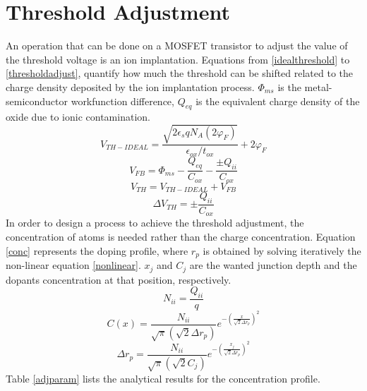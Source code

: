 \documentclass[11pt,a4paper]{article}
\begin{document}
	\section{Threshold Adjustment}
	An operation that can be done on a MOSFET transistor to adjust the value of the threshold voltage is an ion implantation. Equations from \ref*{idealthreshold} to \ref*{thresholdadjust}, quantify how much the threshold can be shifted related to the charge density deposited by the ion implantation process. $\Phi_{ms}$ is the metal-semiconductor workfunction difference, $Q_{eq}$ is the equivalent charge density of the oxide due to ionic contamination.
	\begin{equation}\label{idealthreshold}
		V_{TH-IDEAL} = \frac{\sqrt{2\epsilon_s q N_A\left(2\varphi_F\right)}}{\epsilon_{ox}/t_{ox}} + 2\varphi_F
	\end{equation}
	\begin{equation}\label{flatband}
		V_{FB} = \Phi_{ms} - \frac{Q_{eq}}{C_{ox}}-\frac{\pm Q_{ii}}{C_{ox}}
	\end{equation}
	\begin{equation}\label{realthreshold}
		V_{TH} = V_{TH-IDEAL} + V_{FB}
	\end{equation}
	\begin{equation}\label{thresholdadjust}
		\Delta V_{TH} = \pm\frac{Q_{ii}}{C_{ox}}
	\end{equation}
	In order to design a process to achieve the threshold adjustment, the concentration of atoms is needed rather than the charge concentration. Equation \ref*{conc} represents the doping profile, where $r_p$ is obtained by solving iteratively the non-linear equation \ref*{nonlinear}. $x_j$ and $C_j$ are the wanted junction depth and the dopants concentration at that position, respectively.   
	\begin{equation}
		N_{ii} = \frac{Q_{ii}}{q}
	\end{equation}
	\begin{equation} \label{conc}
	C(x) = \frac{N_{ii}}{\sqrt{\pi}\left(\sqrt{2}\Delta r_p\right)}e^{-\left(\frac{x}{\sqrt{2}\Delta r_p }\right)^2}
	\end{equation}
	\begin{equation}\label{nonlinear}
		\Delta r_p = \frac{N_{ii}}{\sqrt{\pi}\left(\sqrt{2}C_j\right)}e^{-\left(\frac{x_j}{\sqrt{2}\Delta r_p }\right)^2}
	\end{equation}
	Table \ref*{adjparam} lists the analytical results for the concentration profile. 
\end{document}
